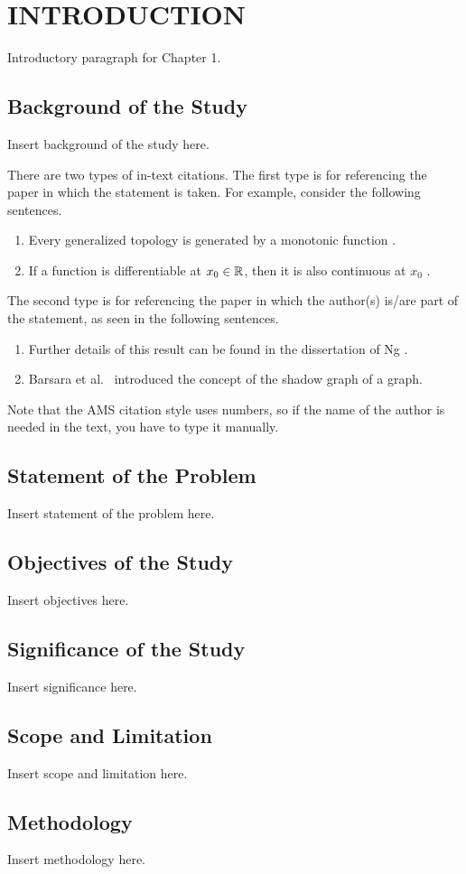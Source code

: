 \chapter{INTRODUCTION}

Introductory paragraph for Chapter 1.

\section{Background of the Study}

Insert background of the study here.

There are two types of in-text citations. The first type is for referencing the paper in which the statement is taken. For example, consider the following sentences.
\begin{enumerate}
	\item Every generalized topology is generated by a monotonic function \cite{JlEx}.
	\item If a function is differentiable at $x_0\in\mathbb{R}$, then it is also continuous at $x_0$ \cite{BkEx}.
\end{enumerate}

The second type is for referencing the paper in which the author(s) is/are part of the statement, as seen in the following sentences.
\begin{enumerate}
	\item Further details of this result can be found in the dissertation of Ng \cite{ThEx}.
	\item Barsara et al.~\cite{bvv11} introduced the concept of the shadow graph of a graph.
\end{enumerate}

Note that the AMS citation style uses numbers, so if the name of the author is needed in the text, you have to type it manually.

\section{Statement of the Problem}

Insert statement of the problem here.

\section{Objectives of the Study}

Insert objectives here.

\section{Significance of the Study}

Insert significance here.

\section{Scope and Limitation}

Insert scope and limitation here.

\section{Methodology}

Insert methodology here.